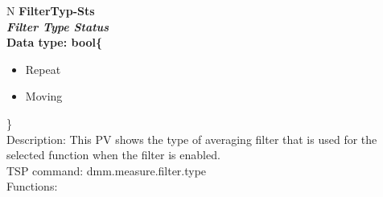 \documentclass[openany]{article}
\begin{document}
		\begin{tabular}{N}
			\hline
			\bfseries FilterTyp-Sts\label{pv:filtertyp-sts} \\ \hline
			\emph{Filter Type Status} \\
			Data type: bool\{\begin{itemize}[noitemsep]
				\item[] Repeat
				\item[] Moving
			\end{itemize}\} \\
			Description: This PV shows the type of averaging filter that is used for the selected function when the filter is enabled. \\
			TSP command: dmm.measure.filter.type \\
			Functions: \\
			\arrayrulecolor{\FuncTableBorderColor}

		\end{tabular}
\end{document}
